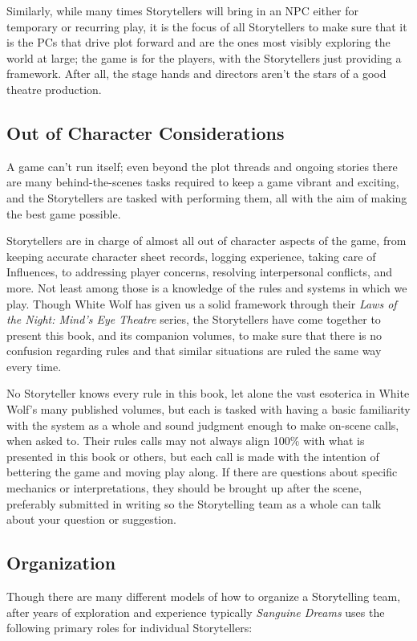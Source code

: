 Similarly, while many times Storytellers will bring in an NPC either for temporary or 
recurring play, it is the focus of all Storytellers to make sure that it is the PCs that 
drive plot forward and are the ones most visibly exploring the world at large; the game 
is for the players, with the Storytellers just providing a framework.  After all, the 
stage hands and directors aren't the stars of a good theatre production.

\subsection{Out of Character Considerations}
A game can't run itself; even beyond the plot threads and ongoing stories there are 
many behind-the-scenes tasks required to keep a game vibrant and exciting, and the 
Storytellers are tasked with performing them, all with the aim of making the best 
game possible.

Storytellers are in charge of almost all out of character aspects of the game, from 
keeping accurate character sheet records, logging experience, taking care of Influences, 
to addressing player concerns, resolving interpersonal conflicts, and more.  Not least 
among those is a knowledge of the rules and systems in which we play.  Though White Wolf 
has given us a solid framework through their \emph{Laws of the Night: Mind's Eye Theatre} 
series, the Storytellers have come together to present this book, and its companion volumes, 
to make sure that there is no confusion regarding rules and that similar situations are ruled 
the same way every time.

No Storyteller knows every rule in this book, let alone the vast esoterica in White Wolf's 
many published volumes, but each is tasked with having a basic familiarity with the system 
as a whole and sound judgment enough to make on-scene calls, when asked to.  Their rules 
calls may not always align 100\% with what is presented in this book or others, but each 
call is made with the intention of bettering the game and moving play along.  If there are 
questions about specific mechanics or interpretations, they should be brought up after the 
scene, preferably submitted in writing so the Storytelling team as a whole can talk about 
your question or suggestion.

\subsection{Organization}
Though there are many different models of how to organize a Storytelling team, after years 
of exploration and experience typically \emph{Sanguine Dreams} uses the following primary 
roles for individual Storytellers:

